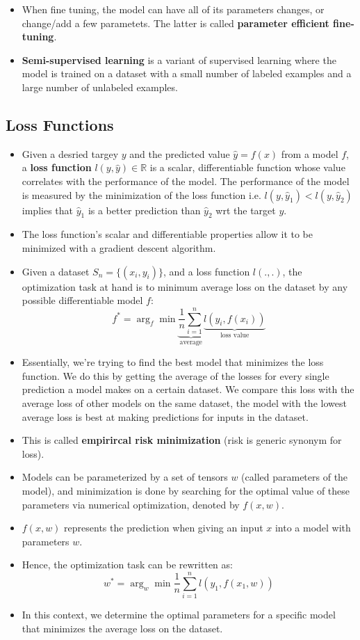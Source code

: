 \documentclass{article}
\newcommand{\tbf}[1]{\textbf{#1}}
\begin{document}
\begin{itemize}
    \item When fine tuning, the model can have all of its parameters changes, or change/add a few parametets. The latter is called \tbf{parameter efficient fine-tuning}.   
    \item \tbf{Semi-supervised learning} is a variant of supervised learning where the model is trained on a dataset with a small number of labeled examples and a large number of unlabeled examples.

\end{itemize}

\subsection{Loss Functions}

\begin{itemize}
    \item Given a desried targey $y$ and the predicted value $\hat{y} = f(x)$ from a model $f$, 
    a \tbf{loss function} $l(y, \hat{y}) \in \mathbb{R}$ is a scalar, differentiable function whose value correlates with the performance of the model.
    The performance of the model is measured by the minimization of the loss function i.e. $l(y, \hat{y}_1) < l(y, \hat{y}_2)$ implies that $\hat{y}_1$ is a better prediction than $\hat{y}_2$
    wrt the target $y$.
    \item The loss function's scalar and differentiable properties allow it to be minimized with a gradient descent algorithm. 
    \item Given a dataset $S_n = \{(x_i, y_i)\}$, and a loss function $l(.,.)$, the optimization task at hand is to minimum average loss on the dataset by any possible differentiable model $f$:
    \[f^* = \arg _f\min \underbrace{\frac{1}{n}\sum_{i=1}^{n}}_{\text{average}}\underbrace{l(y_i, f(x_i))}_{\text{loss value}}\]
    \item Essentially, we're trying to find the best model that minimizes the loss function. 
    We do this by getting the average of the losses for every single prediction a model makes on a certain dataset.
    We compare this loss with the average loss of other models on the same dataset, the model with the lowest average loss is best at making predictions for inputs in the dataset. 
    \item This is called \tbf{empirircal risk minimization} (risk is generic synonym for loss).
    \item Models can be parameterized by a set of tensors $w$ (called parameters of the model), 
    and minimization is done by searching for the optimal value of these parameters via numerical optimization, denoted by $f(x,w)$.
    \item $f(x,w)$ represents the prediction when giving an input $x$ into a model with parameters $w$.
    \item Hence, the optimization task can be rewritten as:
    \[w^* = \arg _w \min \frac{1}{n} \sum^n_{i=1}l(y_1, f(x_1,w))\]
    \item In this context, we determine the optimal parameters for a specific model that minimizes the average loss on the dataset. 
\end{itemize}
\end{document}
